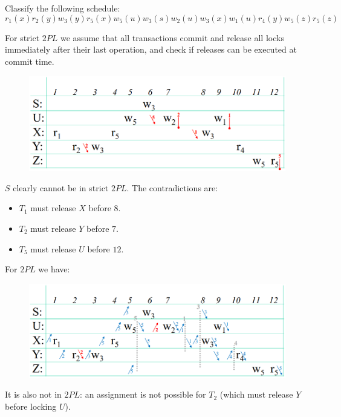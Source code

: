 \documentclass[12pt, a4paper]{report}
\newtheorem[style=M,bodystyle=\normalfont]{theorem}{Theorem}
\newtheorem[style=M,bodystyle=\normalfont]{corollary}{Corollary}
\newtheorem[style=M,bodystyle=\normalfont]{lemma}{Lemma}
\newtheorem[style=M,bodystyle=\normalfont]{definition}{Definition}
\begin{document}
    \begin{Exercise}[label=1]
        Classify the following schedule: 
        \[r_1(x) r_2(y) w_3(y) r_5(x) w_5(u) w_3(s) w_2(u) w_3(x) w_1(u) r_4(y) w_5(z) r_5(z)\]
    \end{Exercise}
    \begin{Answer}[ref=1]
        For strict $2PL$ we assume that all transactions commit and release all locks immediately after their last operation, and check if releases can be executed at commit time.
        \begin{figure}[H]
            \centering
            \includegraphics[width=1\linewidth]{images/2PL1.png}
        \end{figure}
        $S$ clearly cannot be in strict $2PL$. The contradictions are:
        \begin{itemize}
            \item $T_1$ must release $X$ before $8$. 
            \item $T_2$ must release $Y$ before $7$.
            \item $T_5$ must release $U$ before $12$.
        \end{itemize}
        For $2PL$ we have: 
        \begin{figure}[H]
            \centering
            \includegraphics[width=1\linewidth]{images/2PL2.png}
        \end{figure}
        It is also not in $2PL$: an assignment is not possible for $T_2$ (which must release $Y$ before locking $U$).
    \end{Answer}
\end{document}
